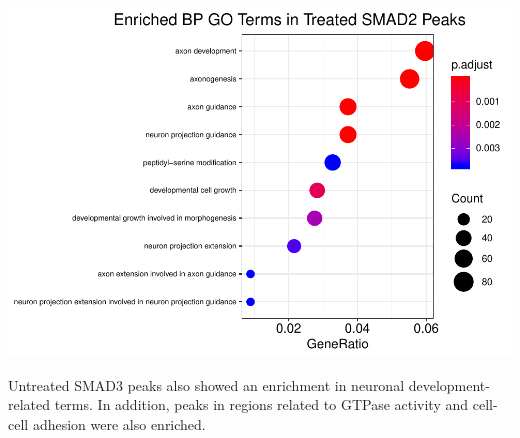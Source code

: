 \documentclass[]{article}
\begin{document}
\clearpage{}

\includegraphics{Bioinfo_Analysis_files/figure-latex/unnamed-chunk-10-1.pdf}

Untreated SMAD3 peaks also showed an enrichment in neuronal
development-related terms. In addition, peaks in regions related to
GTPase activity and cell-cell adhesion were also enriched.

\clearpage{}
\end{document}
